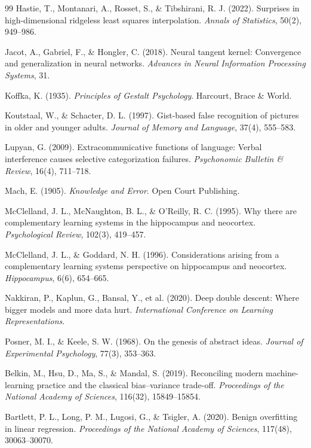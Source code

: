\documentclass[12pt,a4paper]{article}
\begin{document}
\begin{thebibliography}{99}
Hastie, T., Montanari, A., Rosset, S., \& Tibshirani, R. J. (2022).
Surprises in high-dimensional ridgeless least squares interpolation.
\textit{Annals of Statistics}, 50(2), 949--986.

Jacot, A., Gabriel, F., \& Hongler, C. (2018).
Neural tangent kernel: Convergence and generalization in neural networks.
\textit{Advances in Neural Information Processing Systems}, 31.

Koffka, K. (1935).
\textit{Principles of Gestalt Psychology}.
Harcourt, Brace \& World.

Koutstaal, W., \& Schacter, D. L. (1997).
Gist-based false recognition of pictures in older and younger adults.
\textit{Journal of Memory and Language}, 37(4), 555--583.

Lupyan, G. (2009).
Extracommunicative functions of language: Verbal interference causes selective categorization failures.
\textit{Psychonomic Bulletin \& Review}, 16(4), 711--718.

Mach, E. (1905).
\textit{Knowledge and Error}.
Open Court Publishing.

McClelland, J. L., McNaughton, B. L., \& O'Reilly, R. C. (1995).
Why there are complementary learning systems in the hippocampus and neocortex.
\textit{Psychological Review}, 102(3), 419--457.

McClelland, J. L., \& Goddard, N. H. (1996).
Considerations arising from a complementary learning systems perspective on hippocampus and neocortex.
\textit{Hippocampus}, 6(6), 654--665.

Nakkiran, P., Kaplun, G., Bansal, Y., et al. (2020).
Deep double descent: Where bigger models and more data hurt.
\textit{International Conference on Learning Representations}.

Posner, M. I., \& Keele, S. W. (1968).
On the genesis of abstract ideas.
\textit{Journal of Experimental Psychology}, 77(3), 353--363.

Belkin, M., Hsu, D., Ma, S., \& Mandal, S. (2019).
Reconciling modern machine-learning practice and the classical bias--variance trade-off.
\textit{Proceedings of the National Academy of Sciences}, 116(32), 15849--15854.

Bartlett, P. L., Long, P. M., Lugosi, G., \& Tsigler, A. (2020).
Benign overfitting in linear regression.
\textit{Proceedings of the National Academy of Sciences}, 117(48), 30063--30070.


\end{thebibliography}
\end{document}

